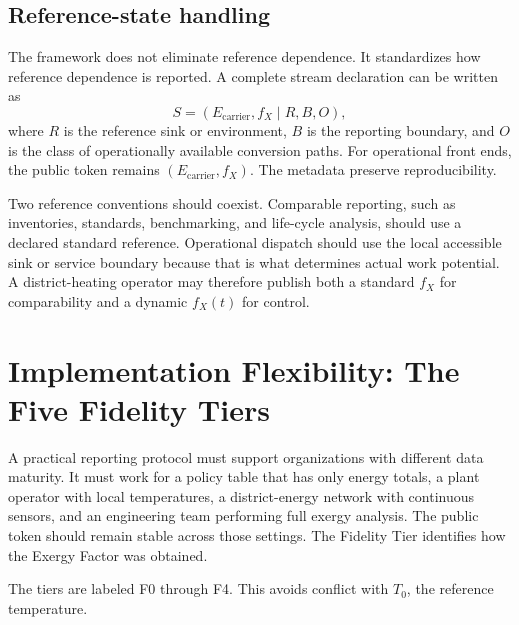 \documentclass[11pt]{article}
\newcommand{\fx}{f_X}
\newcommand{\carrier}{\mathrm{carrier}}
\begin{document}
\subsection{Reference-state handling}

The framework does not eliminate reference dependence. It standardizes how reference dependence is reported. A complete stream declaration can be written as
\begin{equation}
S=(E_{\carrier},\fx\mid R,B,O),
\end{equation}
where $R$ is the reference sink or environment, $B$ is the reporting boundary, and $O$ is the class of operationally available conversion paths. For operational front ends, the public token remains $(E_{\carrier},\fx)$. The metadata preserve reproducibility.

Two reference conventions should coexist. Comparable reporting, such as inventories, standards, benchmarking, and life-cycle analysis, should use a declared standard reference. Operational dispatch should use the local accessible sink or service boundary because that is what determines actual work potential. A district-heating operator may therefore publish both a standard $\fx$ for comparability and a dynamic $\fx(t)$ for control.

\section{Implementation Flexibility: The Five Fidelity Tiers}

A practical reporting protocol must support organizations with different data maturity. It must work for a policy table that has only energy totals, a plant operator with local temperatures, a district-energy network with continuous sensors, and an engineering team performing full exergy analysis. The public token should remain stable across those settings. The Fidelity Tier identifies how the Exergy Factor was obtained.

The tiers are labeled F0 through F4. This avoids conflict with $T_0$, the reference temperature.
\end{document}
